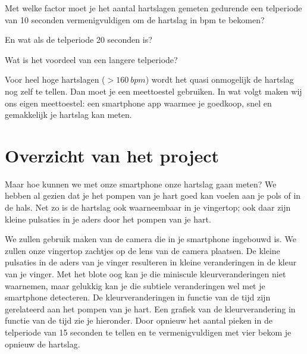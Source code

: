 \begin{oef}
	Met welke factor moet je het aantal hartslagen gemeten gedurende een telperiode van 10 seconden vermenigvuldigen om de hartslag in bpm te bekomen? 
	
	En wat als de telperiode 20 seconden is?
	
	Wat is het voordeel van een langere telperiode?
\end{oef}

Voor heel hoge hartslagen ($>160~bpm$) wordt het quasi onmogelijk de hartslag nog zelf te tellen. Dan moet je een meettoestel gebruiken. In wat volgt maken wij ons eigen meettoestel: een smartphone app waarmee je goedkoop, snel en gemakkelijk je hartslag kan meten.

\section{Overzicht van het project}
\label{sec:Mod1_Sec3}

Maar hoe kunnen we met onze smartphone onze hartslag gaan meten? We hebben al gezien dat je het pompen van je hart goed kan voelen aan je pols of in de hals. Net zo is de hartslag ook waarneembaar in je vingertop; ook daar zijn kleine pulsaties in je aders door het pompen van je hart. 


We zullen gebruik maken van de camera die in je smartphone ingebouwd is. We zullen onze vingertop zachtjes op de lens van de camera plaatsen. De kleine pulsaties in de aders van je vinger resulteren in kleine veranderingen in de kleur van je vinger. Met het blote oog kan je die miniscule kleurveranderingen niet waarnemen, maar gelukkig kan je die subtiele veranderingen wel met je smartphone detecteren. De kleurveranderingen in functie van de tijd zijn gerelateerd aan het pompen van je hart. Een grafiek van de kleurverandering in functie van de tijd zie je hieronder. Door opnieuw het aantal pieken in de telperiode van 15 seconden te tellen en te vermenigvuldigen met vier bekom je opnieuw de hartslag.

